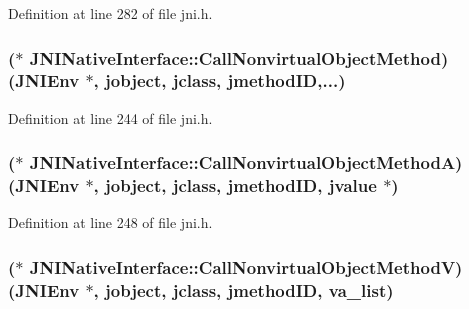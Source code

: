 Definition at line 282 of file jni.\-h.

\hypertarget{struct_j_n_i_native_interface_a379a7834ae4c015efb4996f2d0d9a4e4}{
\subsubsection[{Call\-Nonvirtual\-Object\-Method}]{($\ast$ J\-N\-I\-Native\-Interface\-::\-Call\-Nonvirtual\-Object\-Method)({\bf J\-N\-I\-Env} $\ast$, {\bf jobject}, {\bf jclass}, {\bf jmethod\-I\-D},...)}}\label{struct_j_n_i_native_interface_a379a7834ae4c015efb4996f2d0d9a4e4}


Definition at line 244 of file jni.\-h.

\hypertarget{struct_j_n_i_native_interface_a9c82c9f35ded2ff98df433dd8b888589}{
\subsubsection[{Call\-Nonvirtual\-Object\-Method\-A}]{($\ast$ J\-N\-I\-Native\-Interface\-::\-Call\-Nonvirtual\-Object\-Method\-A)({\bf J\-N\-I\-Env} $\ast$, {\bf jobject}, {\bf jclass}, {\bf jmethod\-I\-D}, {\bf jvalue} $\ast$)}}\label{struct_j_n_i_native_interface_a9c82c9f35ded2ff98df433dd8b888589}


Definition at line 248 of file jni.\-h.

\hypertarget{struct_j_n_i_native_interface_a13d0d3b36ddc094fdbdd7f5154374c1b}{
\subsubsection[{Call\-Nonvirtual\-Object\-Method\-V}]{($\ast$ J\-N\-I\-Native\-Interface\-::\-Call\-Nonvirtual\-Object\-Method\-V)({\bf J\-N\-I\-Env} $\ast$, {\bf jobject}, {\bf jclass}, {\bf jmethod\-I\-D}, va\-\_\-list)}}\label{struct_j_n_i_native_interface_a13d0d3b36ddc094fdbdd7f5154374c1b}


